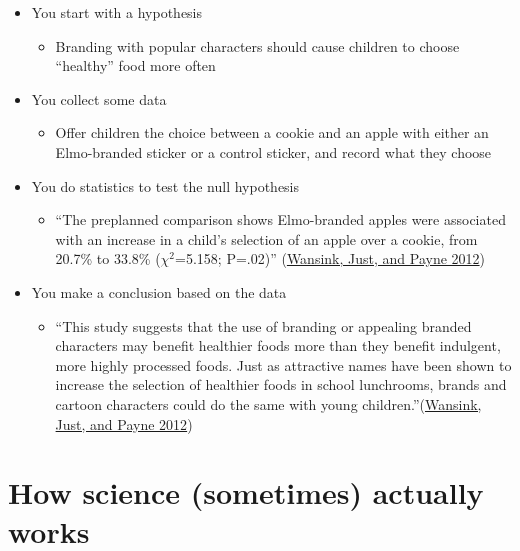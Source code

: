 \documentclass[
  12pt,
]{book}
\providecommand{\tightlist}{%
  \setlength{\itemsep}{0pt}\setlength{\parskip}{0pt}}
\begin{document}
\begin{itemize}
\tightlist
\item
  You start with a hypothesis

  \begin{itemize}
  \tightlist
  \item
    Branding with popular characters should cause children to choose ``healthy'' food more often
  \end{itemize}
\item
  You collect some data

  \begin{itemize}
  \tightlist
  \item
    Offer children the choice between a cookie and an apple with either an Elmo-branded sticker or a control sticker, and record what they choose
  \end{itemize}
\item
  You do statistics to test the null hypothesis

  \begin{itemize}
  \tightlist
  \item
    ``The preplanned comparison shows Elmo-branded apples were associated with an increase in a child's selection of an apple over a cookie, from 20.7\% to 33.8\% (\(\chi^2\)=5.158; P=.02)'' (\protect\hyperlink{ref-wans:just:payn:2012}{Wansink, Just, and Payne 2012})
  \end{itemize}
\item
  You make a conclusion based on the data

  \begin{itemize}
  \tightlist
  \item
    ``This study suggests that the use of branding or appealing branded characters may benefit healthier foods more than they benefit indulgent, more highly processed foods. Just as attractive names have been shown to increase the selection of healthier foods in school lunchrooms, brands and cartoon characters could do the same with young children.''(\protect\hyperlink{ref-wans:just:payn:2012}{Wansink, Just, and Payne 2012})
  \end{itemize}
\end{itemize}

\hypertarget{how-science-sometimes-actually-works}{%
\section{How science (sometimes) actually works}\label{how-science-sometimes-actually-works}}
\end{document}
